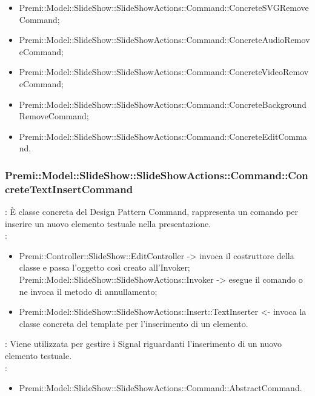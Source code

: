 {{\begin{itemize}
                    \item Premi::Model::SlideShow::SlideShowActions::Command::ConcreteSVGRemoveCommand;
                    \item Premi::Model::SlideShow::SlideShowActions::Command::ConcreteAudioRemoveCommand;
                    \item Premi::Model::SlideShow::SlideShowActions::Command::ConcreteVideoRemoveCommand;
                    \item Premi::Model::SlideShow::SlideShowActions::Command::ConcreteBackgroundRemoveCommand;
                    \item Premi::Model::SlideShow::SlideShowActions::Command::ConcreteEditCommand.
                    \end{itemize}
                    }
    \subsubsection{Premi::Model::SlideShow::SlideShowActions::Command::ConcreteTextInsertCommand}{
				\textbf{\tipo}: È classe concreta del Design Pattern Command, rappresenta un comando per inserire un nuovo elemento testuale nella presentazione.\\	
				\textbf{\relaz}: 
				\begin{itemize}
					\item Premi::Controller::SlideShow::EditController -> invoca il costruttore della classe e passa l’oggetto così creato all’Invoker;
Premi::Model::SlideShow::SlideShowActions::Invoker -> esegue il comando o ne invoca il metodo di annullamento;
                    \item Premi::Model::SlideShow::SlideShowActions::Insert::TextInserter <- invoca la classe concreta del template per l’inserimento di un elemento.
				\end{itemize}	
                \textbf{\interfacce}: Viene utilizzata per gestire i Signal riguardanti l’inserimento di un nuovo elemento testuale.\\
                \textbf{\base}: 
                    \begin{itemize}
                    \item Premi::Model::SlideShow::SlideShowActions::Command::AbstractCommand.
                    \end{itemize}
                    }
}
